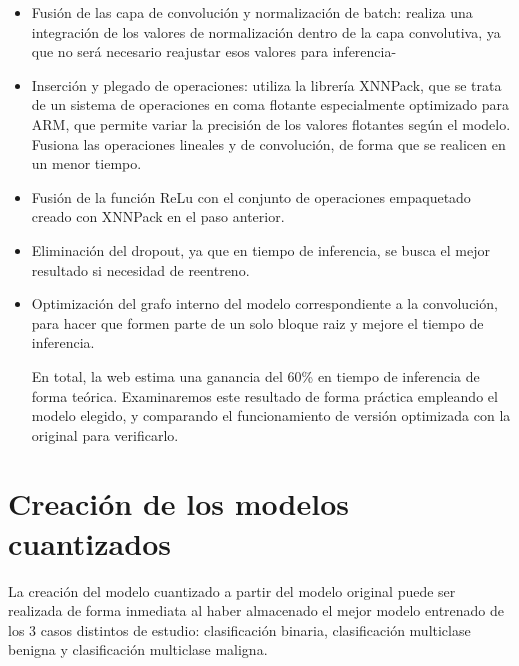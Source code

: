 \begin{itemize}
	\item Fusión de las capa de convolución y normalización de batch: realiza una integración de los valores de normalización dentro de la capa convolutiva, ya que no será necesario reajustar esos valores para inferencia-
	\item Inserción y plegado de operaciones: utiliza la librería XNNPack, que se trata de un sistema de operaciones en coma flotante especialmente optimizado para ARM, que permite variar la precisión de los valores flotantes según el modelo. Fusiona las operaciones lineales y de convolución, de forma que se realicen en un menor tiempo.
	\item Fusión de la función ReLu con el conjunto de operaciones empaquetado creado con XNNPack en el paso anterior.
	\item Eliminación del dropout, ya que en tiempo de inferencia, se busca el mejor resultado si necesidad de reentreno.
	\item Optimización del grafo interno del modelo correspondiente a la convolución, para hacer que formen parte de un solo bloque raiz y mejore el tiempo de inferencia.
	
	En total, la web estima una ganancia del 60\% en tiempo de inferencia de forma teórica. Examinaremos este resultado de forma práctica empleando el modelo elegido, y comparando el funcionamiento de versión optimizada con la original para verificarlo.
	
\end{itemize}

\section{Creación de los modelos cuantizados}

La creación del modelo cuantizado a partir del modelo original puede ser realizada de forma inmediata al haber almacenado el mejor modelo entrenado de los 3 casos distintos de estudio: clasificación binaria, clasificación multiclase benigna y clasificación multiclase maligna.\\

